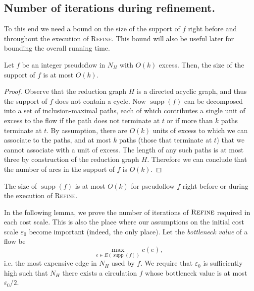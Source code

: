\documentclass[a4paper,UKenglish]{socg-lipics-v2018}
\def\etal{\emph{et~al.}}
\def\etal{\textit{et~al.}}
\def\eps{\varepsilon}
\def\supp{\operatorname{supp}}
\theoremstyle{plain}
\numberwithin{figure}{section}
\def\EMPH#1{\textcolor{BrickRed}{{\emph{#1}}}}
\begin{document}
\begin{toappendix}
\subsection{Number of iterations during refinement.}
\label{SSA:num-iterations-refine}


To this end we need a bound on the size of the support of $f$ right before and throughout the execution of \textsc{Refine}.
This bound will also be useful later for bounding the overall running time.

\begin{lemmarep}
\label{lemma:reduction_count}
Let $f$ be an integer pseudoflow in $N_H$ with $O(k)$ excess.
Then, the size of the support of $f$ is at most $O(k)$.
\end{lemmarep}

\begin{proof}
Observe that the reduction graph $H$ is a directed acyclic graph, and thus the support of $f$ does not contain a cycle.
Now $\supp(f)$ can be decomposed into a set of inclusion-maximal paths,
each of which contributes a single unit of excess to the flow if the path does not terminate at $t$ or if more than $k$ paths terminate at $t$.
By assumption, there are $O(k)$ units of excess to which we can associate to the paths, and at most $k$ paths (those that terminate at $t$) that we cannot associate with a unit of excess.
The length of any such paths is at most  three by construction of the reduction graph $H$.
Therefore we can conclude that the number of arcs in the support of $f$ is $O(k)$.
\end{proof}

\begin{corollary}
\label{corollary:support_size_during}
The size of $\supp(f)$ is at most $O(k)$ for pseudoflow $f$ right before or during the execution of \textsc{Refine}.
\end{corollary}

\end{toappendix}

In the following lemma, we prove the number of iterations of $\textsc{Refine}$
required in each cost scale.
This is also the place where our assumptions on the initial cost scale $\eps_0$
become important (indeed, the only place).
Let the \EMPH{bottleneck value} of a flow be 
\[
\max_{e \in E(\supp(f))} c(e),
\]
i.e. the most expensive edge in $N_H$ used by $f$.
We require that $\eps_0$ is sufficiently high such that $N_H$ there exists a
circulation $f$ whose bottleneck value is at most $\eps_0/2$.
\end{document}
